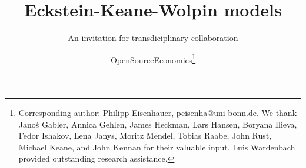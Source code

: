 
\title{Eckstein-Keane-Wolpin models}
\subtitle{An invitation for transdiciplinary collaboration}
\author{OpenSourceEconomics\thanks{Corresponding author: Philipp Eisenhauer, peisenha@uni-bonn.de. We thank  Jano\'s Gabler, Annica Gehlen, James Heckman, Lars Hansen, Boryana Ilieva, Fedor Ishakov, Lena Janys, Moritz Mendel, Tobias Raabe, John Rust, Michael Keane, and John Kennan for their valuable input. Luis Wardenbach provided outstanding research assistance.}}
\date{}
